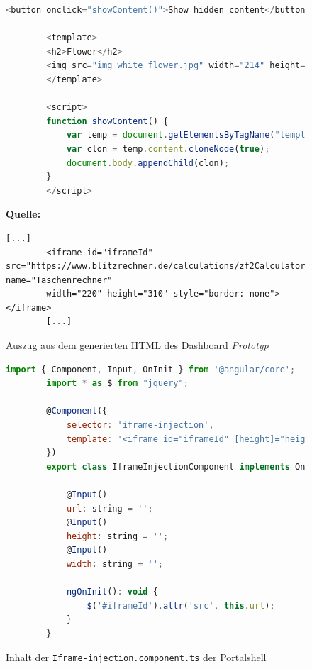 \newpage
\begin{figure}[bht]
	\begin{lstlisting}[caption=Nutzung eines HTML Templates, label=list:HTMLTemplate, language=Javascript]
		<button onclick="showContent()">Show hidden content</button>
		
		<template>
		<h2>Flower</h2>
		<img src="img_white_flower.jpg" width="214" height="204">
		</template>
		
		<script>
		function showContent() {
			var temp = document.getElementsByTagName("template")[0];
			var clon = temp.content.cloneNode(true);
			document.body.appendChild(clon);
		}
		</script>
	\end{lstlisting}
	\footnoterule{}
	\footnotesize{\textbf{Quelle:} \cite[][]{W3Schools2022}}
\end{figure}

\newpage
\begin{figure}[bht]
	\begin{lstlisting}[caption=Einbindung eines Taschenrechner als Iframe, label=list:PrototypTaschenrechner]
		[...]
		<iframe id="iframeId" src="https://www.blitzrechner.de/calculations/zf2Calculator/zf20.htm" name="Taschenrechner" 
		width="220" height="310" style="border: none"></iframe>
		[...]
	\end{lstlisting}
	\footnoterule{}
	\footnotesize{Auszug aus dem generierten HTML des Dashboard \textit{Prototyp}}
\end{figure}

\begin{figure}[bht]
	\begin{lstlisting}[caption=Quellcode der IframeInjection-Component, label=list:IFrameInjectionComponent, language=Javascript]
		import { Component, Input, OnInit } from '@angular/core';
		import * as $ from "jquery";
		
		@Component({
			selector: 'iframe-injection',
			template: '<iframe id="iframeId" [height]="height" [width]="width"></iframe>'
		})
		export class IframeInjectionComponent implements OnInit {
			
			@Input()
			url: string = '';
			@Input()
			height: string = '';
			@Input()
			width: string = '';
			
			ngOnInit(): void {
				$('#iframeId').attr('src', this.url);
			}
		}
	\end{lstlisting}
	\footnoterule{}
	\footnotesize{Inhalt der \texttt{Iframe-injection.component.ts} der Portalshell}
\end{figure}

